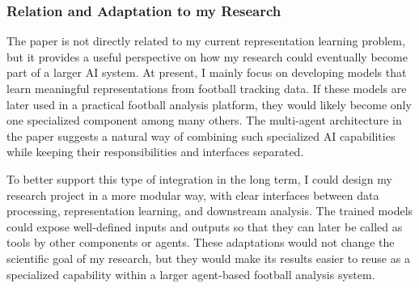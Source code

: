     \subsubsection{Relation and Adaptation to my Research}
    
    The paper is not directly related to my current representation learning problem, but it provides a useful perspective on how my research could eventually become part of a larger AI system. At present, I mainly focus on developing models that learn meaningful representations from football tracking data. If these models are later used in a practical football analysis platform, they would likely become only one specialized component among many others. The multi-agent architecture in the paper suggests a natural way of combining such specialized AI capabilities while keeping their responsibilities and interfaces separated.
    
    To better support this type of integration in the long term, I could design my research project in a more modular way, with clear interfaces between data processing, representation learning, and downstream analysis. The trained models could expose well-defined inputs and outputs so that they can later be called as tools by other components or agents. 
    These adaptations would not change the scientific goal of my research, but they would make its results easier to reuse as a specialized capability within a larger agent-based football analysis system.
